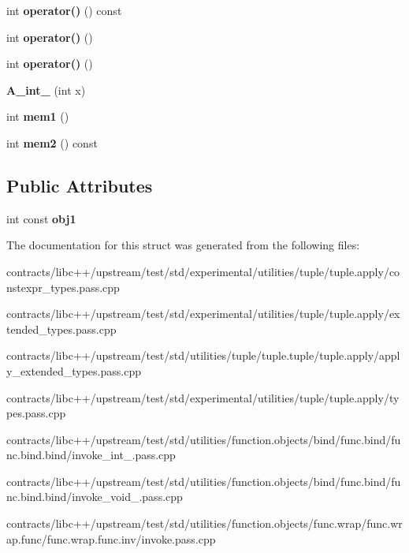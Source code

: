 \begin{DoxyCompactItemize}
int {\bfseries operator()} () const
\item 
\mbox{\label{struct_a__int__0_a43edb19e6da76def9043a799b0934dc4}} 
int {\bfseries operator()} ()
\item 
\mbox{\label{struct_a__int__0_a43edb19e6da76def9043a799b0934dc4}} 
int {\bfseries operator()} ()
\item 
\mbox{\label{struct_a__int__0_a19c26f41fad7f48a915c9a2970aecd04}} 
{\bfseries A\+\_\+int\+\_} (int x)
\item 
\mbox{\label{struct_a__int__0_a34dd3945ba3f0241d42d1da750c56178}} 
int {\bfseries mem1} ()
\item 
\mbox{\label{struct_a__int__0_a76b24b6b63e6984f4d0bbb15f63e614f}} 
int {\bfseries mem2} () const
\end{DoxyCompactItemize}
\subsection*{Public Attributes}
\begin{DoxyCompactItemize}
\item 
\mbox{\label{struct_a__int__0_ac0422b422cfa4885426126affb5c6de8}} 
int const {\bfseries obj1}
\end{DoxyCompactItemize}


The documentation for this struct was generated from the following files\+:\begin{DoxyCompactItemize}
\item 
contracts/libc++/upstream/test/std/experimental/utilities/tuple/tuple.\+apply/constexpr\+\_\+types.\+pass.\+cpp\item 
contracts/libc++/upstream/test/std/experimental/utilities/tuple/tuple.\+apply/extended\+\_\+types.\+pass.\+cpp\item 
contracts/libc++/upstream/test/std/utilities/tuple/tuple.\+tuple/tuple.\+apply/apply\+\_\+extended\+\_\+types.\+pass.\+cpp\item 
contracts/libc++/upstream/test/std/experimental/utilities/tuple/tuple.\+apply/types.\+pass.\+cpp\item 
contracts/libc++/upstream/test/std/utilities/function.\+objects/bind/func.\+bind/func.\+bind.\+bind/invoke\+\_\+int\+\_.\+pass.\+cpp\item 
contracts/libc++/upstream/test/std/utilities/function.\+objects/bind/func.\+bind/func.\+bind.\+bind/invoke\+\_\+void\+\_.\+pass.\+cpp\item 
contracts/libc++/upstream/test/std/utilities/function.\+objects/func.\+wrap/func.\+wrap.\+func/func.\+wrap.\+func.\+inv/invoke.\+pass.\+cpp\end{DoxyCompactItemize}
